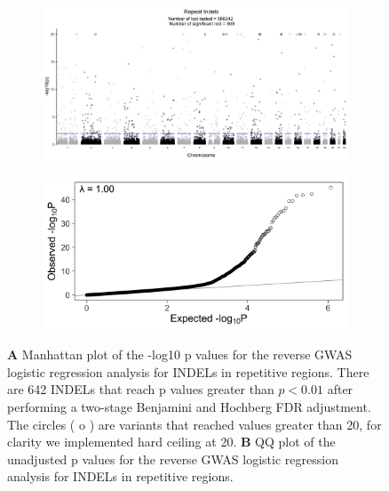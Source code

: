 \documentclass[9pt,lineno]{elife}
\begin{document}
\begin{figure} \centering
    \begin{subfigure}[b]{\linewidth}
        \includegraphics[width=\hsize]{./Figures/ManhattanPlot_RepeatIndels.jpg}
        \label{fig:a}
    \end{subfigure} %

    \begin{subfigure}[b]{\linewidth}
    	\center    
        \includegraphics[width=\hsize]{./Figures/QQPlot_RepeatIndels.jpg}
        \label{fig:b}    
    \end{subfigure} 
    \caption{\textbf{A} Manhattan plot of the -log10 p values for the reverse GWAS logistic regression analysis for INDELs in repetitive regions. There are 642 INDELs that reach p values greater than $ p < 0.01$ after performing a two-stage Benjamini and Hochberg FDR adjustment.  The circles ( o ) are variants that reached values greater than 20, for clarity we implemented hard ceiling at 20. 
  \textbf{B} QQ plot of the unadjusted p values for the reverse GWAS logistic regression analysis for INDELs in repetitive regions.}
  \label{RI_Manhattan}
  \end{figure}
\end{document}
